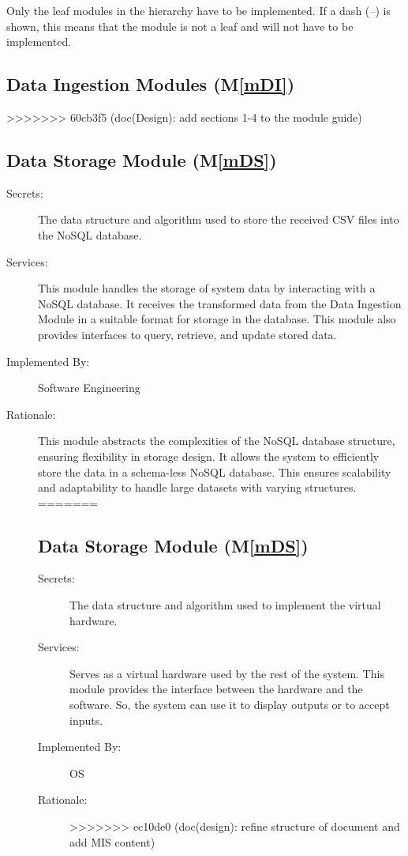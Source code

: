\documentclass[12pt, titlepage]{article}
\newcommand{\mref}[1]{M\ref{#1}}
\begin{document}
Only the leaf modules in the hierarchy have to be implemented. If a dash
(\emph{--}) is shown, this means that the module is not a leaf and will not have
to be implemented.

\subsection{Data Ingestion Modules (\mref{mDI})}
>>>>>>> 60cb3f5 (doc(Design): add sections 1-4 to the module guide)

\subsection{Data Storage Module (\mref{mDS})}
\begin{description}
  \item[Secrets:] The data structure and algorithm used to store the received CSV files into the
  NoSQL database.
  \item[Services:] This module handles the storage of system data by interacting with
  a NoSQL database. It receives the transformed data from the Data Ingestion Module in a suitable
  format for storage in the database. This module also provides interfaces to query, retrieve, and
  update stored data.
  \item[Implemented By:] Software Engineering
  \item[Rationale:] This module abstracts the complexities of the NoSQL database
  structure, ensuring flexibility in storage design. It allows the system to 
  efficiently store the data in a schema-less NoSQL database. This ensures scalability and 
  adaptability to handle large datasets with varying structures.
=======

\subsection{Data Storage Module (\mref{mDS})}
\begin{description}
  \item[Secrets:]The data structure and algorithm used to implement the virtual
    hardware.
  \item[Services:]Serves as a virtual hardware used by the rest of the
    system. This module provides the interface between the hardware and the
    software. So, the system can use it to display outputs or to accept inputs.
  \item[Implemented By:] OS
  \item[Rationale:] 
>>>>>>> ec10de0 (doc(design): refine structure of document and add MIS content)
\end{description}


\end{description}
\end{document}
